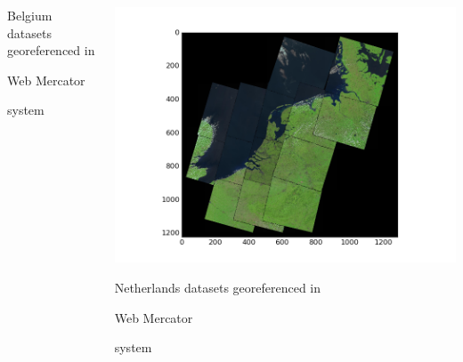 \documentclass[c]{beamer}
\begin{document}
\begin{frame}
\begin{itemize}
{\begin{columns}
\begin{column}{0.33\textwidth}
\begin{overlayarea}{\linewidth}{3cm}
  \end{overlayarea}
  \begin{overlayarea}{\linewidth}{1cm}
    \centering
    \tiny Belgium datasets georeferenced in \begin{itshape}Web Mercator\end{itshape} system\par
  \end{overlayarea}
  \end{column}
  \begin{column}{0.33\textwidth}
  \begin{overlayarea}{\linewidth}{3cm}
    \centering\vfill
    \includegraphics[scale=0.20]{images/Netherlands/covering-selection.png}
  \end{overlayarea}
  \begin{overlayarea}{\linewidth}{1cm}
    \centering
    \tiny Netherlands datasets georeferenced in \begin{itshape}Web Mercator\end{itshape} system\par
  \end{overlayarea}
  \end{column}
 \end{columns}
}
\end{itemize}

\end{frame}
\end{document}
